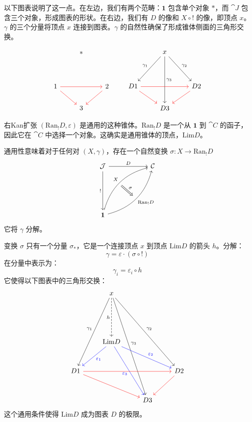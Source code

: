 \documentclass[DaoFP]{subfiles}
\begin{document}
以下图表说明了这一点。在左边，我们有两个范畴：$\mathbf 1$ 包含单个对象 $*$，而 $\cat J$ 包含三个对象，形成图表的形状。在右边，我们有 $D$ 的像和 $X \circ !$ 的像，即顶点 $x$。$\gamma$ 的三个分量将顶点 $x$ 连接到图表。$\gamma$ 的自然性确保了形成锥体侧面的三角形交换。

\[
 \begin{tikzcd}
  & *
 \\
\\
1 
\arrow[rr, red]
\arrow[rd, red]
&& 2
\arrow[dl, red]
\\
& 3
 \end{tikzcd}
 \qquad
 \begin{tikzcd}
  & x
\arrow[ddr, "\gamma_2"]
 \arrow[ddl, "\gamma_1"']
 \arrow[ddd, "\gamma_3"]
 \\
\\
D 1 
\arrow[rr, red]
\arrow[rd, red]
&& D 2
\arrow[dl, red]
\\
& D 3
 \end{tikzcd}
 \]

右Kan扩张 $(\text{Ran}_! D, \varepsilon)$ 是通用的这种锥体。$\text{Ran}_! D$ 是一个从 $\mathbf 1$ 到 $\cat C$ 的函子，因此它在 $\cat C$ 中选择一个对象。这确实是通用锥体的顶点，$\text{Lim} D$。

通用性意味着对于任何对 $(X, \gamma)$，存在一个自然变换 $\sigma \colon X \to \text{Ran}_! D$ 
\[
\begin{tikzcd}[row sep=2cm, column sep=2cm]
\cat J  \ar[d, "!"', "" {name=P}]
            \ar[r, "D", ""  {name=F, below, near start, bend right}]
&
\cat C
\\
\mathbf 1
    \ar[ur, bend left, "X", "" {name=G, below}]
    \ar[ur, bend right, "\text{Ran}_! D"', "" {name=Ran}]
\arrow[Rightarrow, "\sigma", from=G, to=Ran]
\end{tikzcd}
\]
它将 $\gamma$ 分解。

变换 $\sigma$ 只有一个分量 $\sigma_*$，它是一个连接顶点 $x$ 到顶点 $\text{Lim} D$ 的箭头 $h$。分解：
 \[ \gamma = \varepsilon \cdot (\sigma \circ !) \]
在分量中表示为：
\[ \gamma_i = \varepsilon_i \circ h \]
它使得以下图表中的三角形交换：
\[
 \begin{tikzcd}[row sep=1cm]
  & x
\arrow[dddl, "\gamma_1"']
\arrow[ddddr, "\gamma_3"]
\arrow[dddrr, "\gamma_2"]
\arrow[dd, dashed, "h"']
 \\
 \\
 & \text{Lim} D
\arrow[dl, blue, "\varepsilon_1"]
\arrow[ddr, blue, "\varepsilon_3"']
\arrow[drr, blue, "\varepsilon_2"]
\\
D 1 
\arrow[rrr, red]
\arrow[rrd, red]
&&& D 2
\arrow[dl, red]
\\
&& D 3
 \end{tikzcd}
 \]
这个通用条件使得 $\text{Lim} D$ 成为图表 $D$ 的极限。
\end{document}
